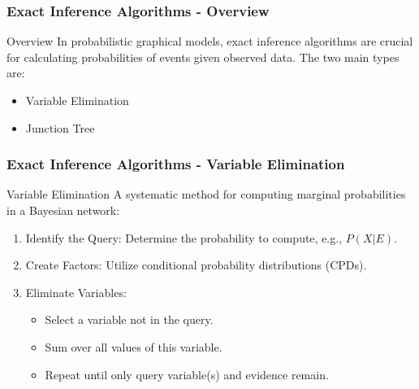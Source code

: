 \documentclass[aspectratio=169]{beamer}
\begin{document}
\begin{frame}[fragile]
    \frametitle{Exact Inference Algorithms - Overview}
    \begin{block}{Overview}
        In probabilistic graphical models, exact inference algorithms are crucial for calculating probabilities of events given observed data. The two main types are:
        \begin{itemize}
            \item Variable Elimination
            \item Junction Tree
        \end{itemize}
    \end{block}
\end{frame}

\begin{frame}[fragile]
    \frametitle{Exact Inference Algorithms - Variable Elimination}
    \begin{block}{Variable Elimination}
        A systematic method for computing marginal probabilities in a Bayesian network:
        \begin{enumerate}
            \item Identify the Query: Determine the probability to compute, e.g., $P(X | E)$.
            \item Create Factors: Utilize conditional probability distributions (CPDs).
            \item Eliminate Variables: 
                \begin{itemize}
                    \item Select a variable not in the query.
                    \item Sum over all values of this variable.
                    \item Repeat until only query variable(s) and evidence remain.
                \end{itemize}
        \end{enumerate}
    \end{block}
\end{frame}
\end{document}
